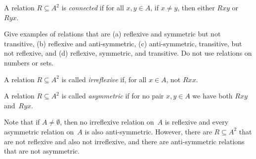 \documentclass[../../../include/open-logic-section]{subfiles}
\begin{document}
\begin{defn}[Connectivity]
A relation $R \subseteq A^2$ is \emph{connected} if for all $x,y\in
A$, if $x \neq y$, then either $Rxy$ or~$Ryx$.
\end{defn}

\begin{prob}
Give examples of relations that are (a) reflexive and symmetric but
not transitive, (b) reflexive and anti-symmetric, (c) anti-symmetric,
transitive, but not reflexive, and (d) reflexive, symmetric, and
transitive.  Do not use relations on numbers or sets.
\end{prob} 
 
\begin{defn}[Irreflexivity]
A relation $R \subseteq A^2$ is called \emph{irreflexive} if, for all $x \in
A$, not $Rxx$. 
\end{defn}

\begin{defn}[Asymmetry]
A relation $R \subseteq A^2$ is called \emph{asymmetric} if for no pair $x,y\in
A$ we have both $Rxy$ and~$Ryx$. 
\end{defn}

Note that if $A \neq \emptyset$, then no irreflexive relation on~$A$
is reflexive and every asymmetric relation on~$A$ is also
anti-symmetric. However, there are $R \subseteq A^2$ that are not
reflexive and also not irreflexive, and there are anti-symmetric
relations that are not asymmetric. 
\end{document}
